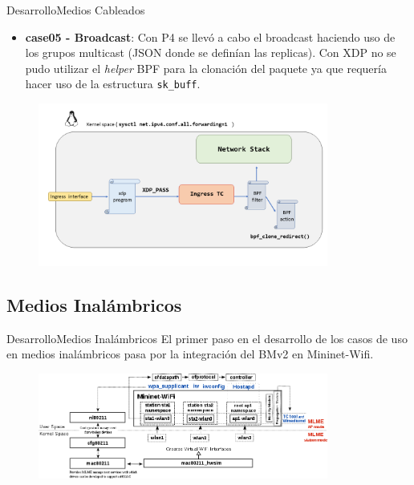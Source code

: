 \documentclass[10pt,compress,xcolor=table]{beamer} %
\begin{document}
\begin{frame}{Desarrollo}{Medios Cableados}
\begin{itemize}
    \item \textbf{case05 - Broadcast}:  Con P4 se llevó a cabo el broadcast haciendo uso de los grupos multicast (JSON donde se definían las replicas). Con XDP no se pudo utilizar el \textit{helper} BPF para la clonación del paquete ya que requería hacer uso de la estructura \texttt{sk\_buff}.
\end{itemize}

\begin{figure}
\includegraphics[width=0.85\textwidth]{img/7.png}
\end{figure}

\end{frame}

\subsection{Medios Inalámbricos}
\begin{frame}{Desarrollo}{Medios Inalámbricos}
El primer paso en el desarrollo de los casos de uso en medios inalámbricos pasa por la integración del BMv2 en Mininet-Wifi.\vspace{0.2cm}

\begin{figure}
\includegraphics[width=0.85\textwidth]{img/mininet_wifi_components.png}
\end{figure}
\end{frame}
\end{document}
